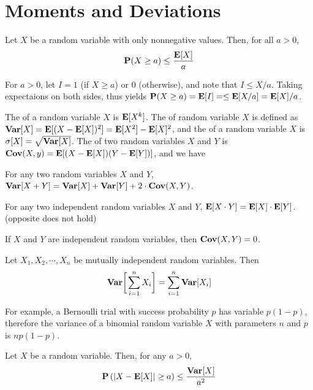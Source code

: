 \documentclass[main.tex]{subfiles}
\begin{document}
\minispacing

\section{Moments and Deviations}

\begin{theorem}
	Let $X$ be a random variable with only nonnegative values. Then, for all $a > 0$,
	\[
		\mathbf{P}(X \ge a) \le \frac{\mathbf{E}[X]}{a}
	\]
\end{theorem}

\begin{pf}
	For $a > 0$, let $I=1$ (if $X\ge a$) or $0$ (otherwise), and note that $I \le X / a$. Taking expectaions on both sides, thus yields $\mathbf{P}(X \ge a) = \mathbf{E}[I] = \le \mathbf{E}[X / a] = \mathbf{E}[X] / a$.
\end{pf}

The  of a random variable $X$ is $\mathbf{E}[X^k]$. The  of random variable $X$ is defined as $\mathbf{Var}[X]=\mathbf{E}[(X-\mathbf{E}[X])^2]=\mathbf{E}[X^2]-\mathbf{E}[X]^2$, and the  of a random variable $X$ is $\sigma[X]=\sqrt{\mathbf{Var}[X]}$. The  of two random variables $X$ and $Y$ is $\mathbf{Cov}(X,y)=\mathbf{E}[(X-\mathbf{E}[X])(Y-\mathbf{E}[Y])]$, and we have

\begin{lemma}
	For any two random variables $X$ and $Y$, $\mathbf{Var}[X+Y]=\mathbf{Var}[X]+\mathbf{Var}[Y]+2\cdot\mathbf{Cov}(X,Y)$.
\end{lemma}

\begin{lemma}
	For any two independent random variables $X$ and $Y$, $\mathbf{E}[X \cdot Y] = \mathbf{E}[X] \cdot \mathbf{E}[Y]$. (opposite does not hold)
\end{lemma}

\begin{corollary}
	If $X$ and $Y$ are independent random variables, then $\mathbf{Cov}(X,Y)=0$.
\end{corollary}

\begin{theorem}
	Let $X_1,X_2,\cdots,X_n$ be mutually independent random variables. Then
	\[
		\mathbf{Var}\biggl[\;\!\sum_{i=1}^{n}X_i\biggr]=\sum_{i=1}^{n}\mathbf{Var}[X_i]
	\]
\end{theorem}

For example, a Bernoulli trial with success probability $p$ has variable $p(1-p)$, therefore the variance of a binomial random variable $X$ with parameters $n$ and $p$ is $np(1-p)$.

\begin{theorem}
	Let $X$ be a random variable. Then, for any $a > 0$,
	\[
		\mathbf{P}\left(\lvert X-\mathbf{E}[X]\rvert\ge a\right)\le \frac{\mathbf{Var}[X]}{a^2}
	\]
\end{theorem}
\end{document}
